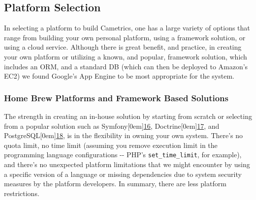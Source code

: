 \documentclass[10pt,a4paper,english]{article}
\begin{document}

\hypertarget{platform-selection}{}
\subsection*{Platform Selection}
\label{platform-selection}

In selecting a platform to build Cametrics, one has a large variety of options that range from building your own personal platform, using a framework solution, or using a cloud service. Although there is great benefit, and practice, in creating your own platform or utilizing a known, and popular, framework solution, which includes an ORM, and a standard DB (which can then be deployed to Amazon's EC2) we found Google's App Engine to be most appropriate for the system.



\hypertarget{home-brew-platforms-and-framework-based-solutions}{}
\subsubsection*{Home Brew Platforms and Framework Based Solutions}
\label{home-brew-platforms-and-framework-based-solutions}

The strength in creating an in-house solution by starting from scratch or selecting from a popular solution such as Symfony\raisebox{.5em}[0em]{\scriptsize\hyperlink{id35}{16}}, Doctrine\raisebox{.5em}[0em]{\scriptsize\hyperlink{id36}{17}}, and PostgreSQL\raisebox{.5em}[0em]{\scriptsize\hyperlink{id37}{18}}, is in the flexibility in owning your own system. There's no quota limit, no time limit (assuming you remove execution limit in the programming language configurations -{}- PHP's \texttt{set{\_}time{\_}limit}, for example), and there's no unexpected platform limitations that we might encounter by using a specific version of a language or missing dependencies due to system security measures by the platform developers. In summary, there are less platform restrictions.
\end{document}
